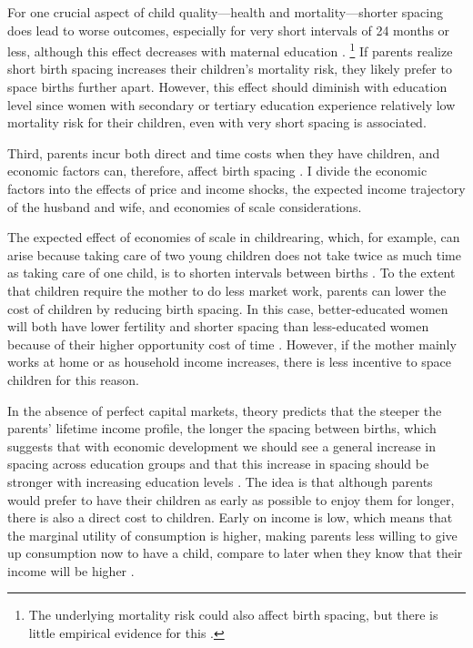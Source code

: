For one crucial aspect of child quality---health and mortality---shorter spacing 
does lead to worse outcomes, especially for very short intervals of 24 months 
or less, although this effect decreases with maternal education
\citep{Whitworth2002,Conde-Agudelo2006,Conde-Agudelo2012,Molitoris2019}.%
\footnote{
The underlying mortality risk could also affect birth spacing, but
there is little empirical evidence for this 
\citep{Newman1983,Newman1988,Bhalotra2008}.
}
If parents realize short birth spacing increases their children's mortality risk, 
they likely prefer to space births further apart.
However, this effect should diminish with education level since women with 
secondary or tertiary education experience relatively low mortality risk for 
their children, even with very short spacing is associated.


Third, parents incur both direct and time costs when they have children, 
and economic factors can, therefore, affect birth spacing \citep{Hotz1997,Schultz1997}.
I divide the economic factors into the effects of price and income shocks,
the expected income trajectory of the husband and wife,
and economies of scale considerations.

The expected effect of economies of scale in childrearing, which, for example, 
can arise because taking care of two young children does not take twice as much 
time as taking care of one child, is to shorten intervals between births
\citep{Vijverberg1982,Espenshade1984}.
To the extent that children require the mother to do less market work, parents 
can lower the cost of children by reducing birth spacing.
In this case, better-educated women will both have lower fertility and shorter
spacing than less-educated women because of their higher opportunity cost of time 
\citep{Ross1974,Newman1981,Newman1984}.
However, if the mother mainly works at home or as household income increases, there 
is less incentive to space children for this reason.

In the absence of perfect capital markets, theory predicts that the steeper 
the parents' lifetime income profile, the longer the spacing between births, 
which suggests that with economic development we should see a general increase 
in spacing across education groups and that this increase in spacing should be 
stronger with increasing education levels
\citep{Heckman1976,Wolpin1984,Newman1988}.
The idea is that although parents would prefer to have their children as early 
as possible to enjoy them for longer, there is also a direct cost to children.
Early on income is low, which means that the marginal utility of consumption is 
higher, making parents less willing to give up consumption now to have a child, 
compare to later when they know that their income will be higher 
\citep{Newman1984,Happel1984}.

